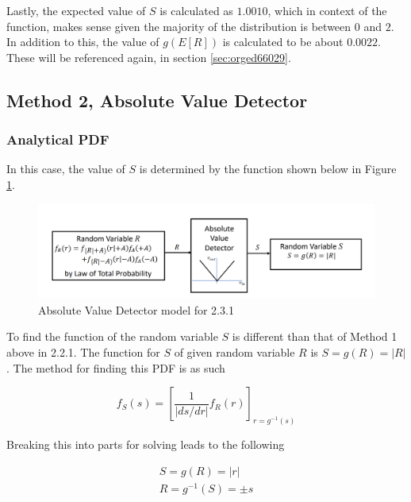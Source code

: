 \documentclass[a4paper, 11pt]{article}
\begin{document}
\smallskip
\bigskip
\noindent
Lastly, the expected value of \(S\) is calculated as \(1.0010\), which in context of the function, makes sense given the majority of the distribution is between \(0\) and \(2\).
In addition to this, the value of \(g(E[R])\) is calculated to be about \(0.0022\). These will be referenced again, in section \ref{sec:orged66029}.

\subsection{Method 2, Absolute Value Detector}
\label{sec:org6b004cd}
\subsubsection{Analytical PDF}
\label{sec:org0f2b302}
In this case, the value of \(S\) is determined by the function shown below in Figure \ref{fig:S2Diagram}.

\begin{figure}[htbp]
\centering
\includegraphics[width=.9\linewidth]{./Images/S2Diagram.png}
\caption{\label{fig:S2Diagram}Absolute Value Detector model for 2.3.1}
\end{figure}

\noindent
To find the function of the random variable \(S\) is different than that of Method 1 above in 2.2.1. The function for \(S\) of given random variable \(R\) is \(S = g(R) = |R|\). The method for finding this PDF is as such

\begin{equation}
\label{eqn:analyticalPDF}
    f_S(s) = \left[ \frac{1}{|ds / dr|} f_R(r) \right]_{r = g^{-1}(s)}
\end{equation}

\bigskip
\noindent
Breaking this into parts for solving leads to the following

\begin{equation}
\label{eqn:gFunc1}
    \begin{gathered}
        S = g(R) = |r| \\
        R = g^{-1}(S) = \pm s \\
    \end{gathered}
\end{equation}
\end{document}
